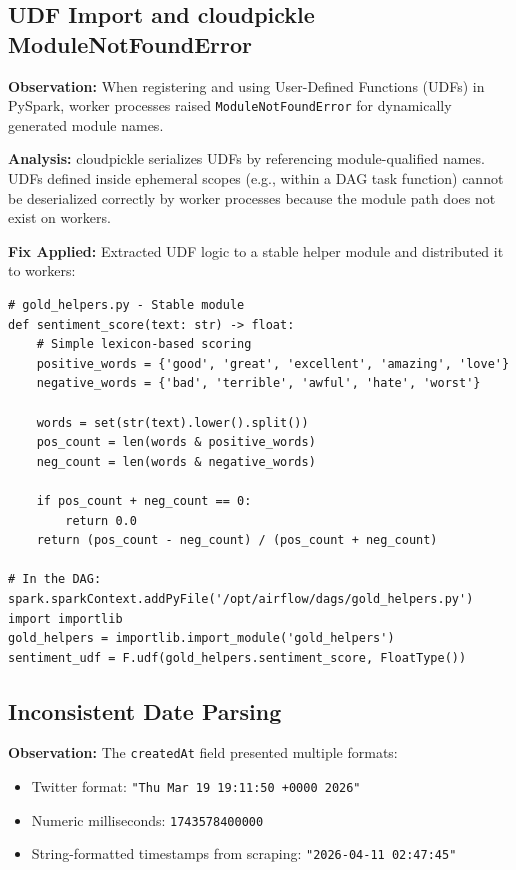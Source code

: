 \documentclass[12pt]{article}
\begin{document}
\subsection{UDF Import and cloudpickle ModuleNotFoundError}

\textbf{Observation:} When registering and using User-Defined Functions (UDFs) in PySpark, worker processes raised \texttt{ModuleNotFoundError} for dynamically generated module names.

\textbf{Analysis:} cloudpickle serializes UDFs by referencing module-qualified names. UDFs defined inside ephemeral scopes (e.g., within a DAG task function) cannot be deserialized correctly by worker processes because the module path does not exist on workers.

\textbf{Fix Applied:} Extracted UDF logic to a stable helper module and distributed it to workers:

\begin{lstlisting}[caption=UDF Helper Module Pattern]
# gold_helpers.py - Stable module
def sentiment_score(text: str) -> float:
    # Simple lexicon-based scoring
    positive_words = {'good', 'great', 'excellent', 'amazing', 'love'}
    negative_words = {'bad', 'terrible', 'awful', 'hate', 'worst'}
    
    words = set(str(text).lower().split())
    pos_count = len(words & positive_words)
    neg_count = len(words & negative_words)
    
    if pos_count + neg_count == 0:
        return 0.0
    return (pos_count - neg_count) / (pos_count + neg_count)

# In the DAG:
spark.sparkContext.addPyFile('/opt/airflow/dags/gold_helpers.py')
import importlib
gold_helpers = importlib.import_module('gold_helpers')
sentiment_udf = F.udf(gold_helpers.sentiment_score, FloatType())
\end{lstlisting}

\subsection{Inconsistent Date Parsing}

\textbf{Observation:} The \texttt{createdAt} field presented multiple formats:
\begin{itemize}
    \item Twitter format: \texttt{"Thu Mar 19 19:11:50 +0000 2026"}
    \item Numeric milliseconds: \texttt{1743578400000}
    \item String-formatted timestamps from scraping: \texttt{"2026-04-11 02:47:45"}
\end{itemize}
\end{document}
